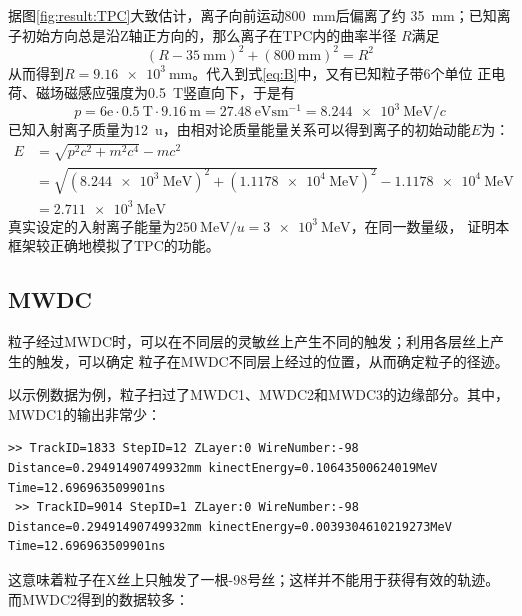 \documentclass[bachelor,openany,oneside,color]{buaathesis}
\begin{document}
据图\ref{fig:result:TPC}大致估计，离子向前运动\SI{800}{\milli\meter}后偏离了约
\SI{35}{\milli\meter}；已知离子初始方向总是沿Z轴正方向的，那么离子在TPC内的曲率半径
$R$满足
\begin{equation}
(R-\SI{35}{\milli\meter})^2+(\SI{800}{\milli\meter})^2=R^2
\end{equation}
从而得到$R=\SI{9.16e3}{\milli\meter}$。代入到式\ref{eq:B}中，又有已知粒子带6个单位
正电荷、磁场磁感应强度为\SI{0.5}{\tesla}竖直向下，于是有
\begin{equation}
p=6\mathrm{e}\cdot\SI{0.5}{\tesla}\cdot\SI{9.16}{\meter}=\SI{27.48}{\eV\second
\meter^{-1}}=\SI{8.244e3}{\mega\eV/c}
\end{equation}
已知入射离子质量为\SI{12}{u}，由相对论质量能量关系可以得到离子的初始动能$E$为：
\begin{equation}
\begin{aligned}
E &	=\sqrt{p^2c^2+m^2c^4}-mc^2\\
& 	=\sqrt{(\SI{8.244e3}{\mega\eV})^2+
		(\SI{1.1178e4}{\mega\eV})^2}-\SI{1.1178e4}{\mega\eV}\\
&	=\SI{2.711e3}{\mega\eV}
\end{aligned}\end{equation}
真实设定的入射离子能量为$\SI{250}{\mega\eV/u}=\SI{3e3}{\mega\eV}$，在同一数量级，
证明本框架较正确地模拟了TPC的功能。

\subsection{MWDC}

粒子经过MWDC时，可以在不同层的灵敏丝上产生不同的触发；利用各层丝上产生的触发，可以确定
粒子在MWDC不同层上经过的位置，从而确定粒子的径迹。

以示例数据为例，粒子扫过了MWDC1、MWDC2和MWDC3的边缘部分。其中，MWDC1的输出非常少：

\begin{lstlisting}[caption={MWDC1},firstnumber=3709,lastline=3710]
 >> TrackID=1833 StepID=12 ZLayer:0 WireNumber:-98 Distance=0.29491490749932mm kinectEnergy=0.10643500624019MeV Time=12.696963509901ns
 >> TrackID=9014 StepID=1 ZLayer:0 WireNumber:-98 Distance=0.29491490749932mm kinectEnergy=0.0039304610219273MeV Time=12.696963509901ns
\end{lstlisting}

这意味着粒子在X丝上只触发了一根-98号丝；这样并不能用于获得有效的轨迹。
而MWDC2得到的数据较多：
\end{document}
